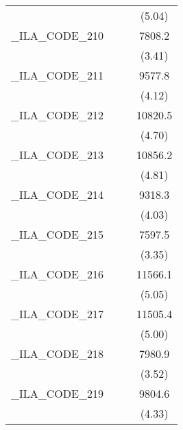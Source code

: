 {\begin{tabular}{l*{3}{c}}
            &                     &                     &      (5.04)         \\
[1em]
\_ILA\_CODE\_210&                     &                     &      7808.2\sym{***}\\
            &                     &                     &      (3.41)         \\
[1em]
\_ILA\_CODE\_211&                     &                     &      9577.8\sym{***}\\
            &                     &                     &      (4.12)         \\
[1em]
\_ILA\_CODE\_212&                     &                     &     10820.5\sym{***}\\
            &                     &                     &      (4.70)         \\
[1em]
\_ILA\_CODE\_213&                     &                     &     10856.2\sym{***}\\
            &                     &                     &      (4.81)         \\
[1em]
\_ILA\_CODE\_214&                     &                     &      9318.3\sym{***}\\
            &                     &                     &      (4.03)         \\
[1em]
\_ILA\_CODE\_215&                     &                     &      7597.5\sym{***}\\
            &                     &                     &      (3.35)         \\
[1em]
\_ILA\_CODE\_216&                     &                     &     11566.1\sym{***}\\
            &                     &                     &      (5.05)         \\
[1em]
\_ILA\_CODE\_217&                     &                     &     11505.4\sym{***}\\
            &                     &                     &      (5.00)         \\
[1em]
\_ILA\_CODE\_218&                     &                     &      7980.9\sym{***}\\
            &                     &                     &      (3.52)         \\
[1em]
\_ILA\_CODE\_219&                     &                     &      9804.6\sym{***}\\
            &                     &                     &      (4.33)         \\

\end{tabular}}
